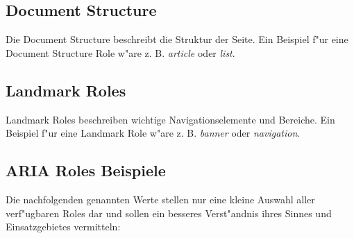 \documentclass[a4paper,bibtotoc,oneside]{scrbook}
\begin{document}
\subsection{Document Structure}
Die Document Structure beschreibt die Struktur der Seite. Ein Beispiel f"ur eine Document Structure Role w"are z. B. \emph{article} oder \emph{list}.\cite[Abschnitt 5.3.3]{aria_roles}

\subsection{Landmark Roles}
Landmark Roles beschreiben wichtige Navigationselemente und Bereiche. Ein Beispiel f"ur eine Landmark Role w"are z. B. \emph{banner} oder \emph{navigation}.\cite[Abschnitt 5.3.4]{aria_roles}

\subsection{ARIA Roles Beispiele}
Die nachfolgenden genannten Werte stellen nur eine kleine Auswahl aller verf"ugbaren Roles dar und sollen ein besseres Verst"andnis ihres Sinnes und  Einsatzgebietes vermitteln:
\end{document}
